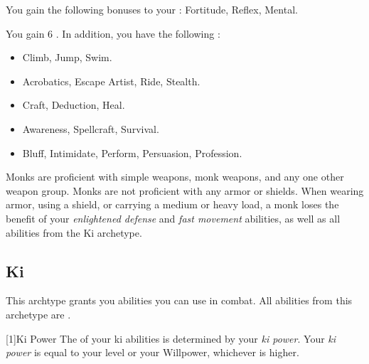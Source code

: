         You gain the following bonuses to your :  Fortitude,  Reflex,  Mental.

        You gain 6 .
        In addition, you have the following :
        \begin{itemize}
            \item {} Climb, Jump, Swim.
            \item {} Acrobatics, Escape Artist, Ride, Stealth.
            \item {} Craft, Deduction, Heal.
            \item {} Awareness, Spellcraft, Survival.
            \item {} Bluff, Intimidate, Perform, Persuasion, Profession.
        \end{itemize}

        Monks are proficient with simple weapons, monk weapons, and any one other weapon group.
        Monks are not proficient with any armor or shields.
        When wearing armor, using a shield, or carrying a medium or heavy load, a monk loses the benefit of your \textit{enlightened defense} and \textit{fast movement} abilities, as well as all abilities from the Ki archetype.

    \subsection{Ki}
        This archtype grants you abilities you can use in combat.
        All abilities from this archetype are .

        [1]{Ki Power}
        The  of your ki abilities is determined by your \textit{ki power}.
        Your \textit{ki power} is equal to your level or your Willpower, whichever is higher.

